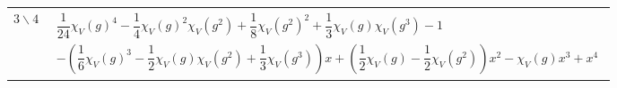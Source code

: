 \documentclass[12pt,a4paper]{article}
\begin{document}
\begin{problem}{3}
\begin{center}
\begin{tabular}{c|c}
                \hline
                $3\backslash4$& \raisebox{-30pt}{\rule{0pt}{66pt}} $\begin{gathered}
                    \dfrac{1}{24} \chi_V(g)^4 - \dfrac{1}{4} \chi_V(g)^2 \chi_V(g^2) + \dfrac{1}{8} \chi_V(g^2)^2 + \dfrac{1}{3} \chi_V(g) \chi_V(g^3) - 1\\
                    - \left(\dfrac{1}{6} \chi_V(g)^3 - \dfrac{1}{2} \chi_V(g) \chi_V(g^2) + \dfrac{1}{3} \chi_V(g^3)\right)x + \left(\dfrac{1}{2} \chi_V(g) - \dfrac{1}{2} \chi_V(g^2)\right)x^2 - \chi_V(g)x^3 + x^4
                \end{gathered}$\\
            \end{tabular}
        \end{center}
    \end{problem}
\end{document}
